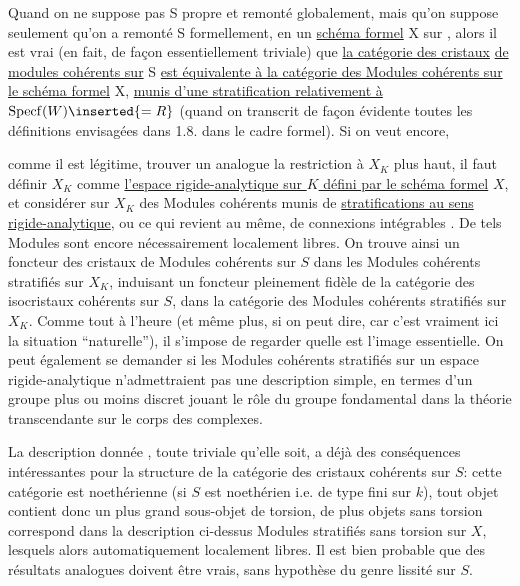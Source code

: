 Quand on ne suppose pas S  propre et remonté globalement, mais qu'on suppose seulement qu'on a remonté S formellement, en un \uline{schéma formel} X sur , alors il est vrai (en fait, de façon essentiellement triviale) que \uline{la catégorie des cristaux}  \uline{de modules cohérents sur} S \uline{est équivalente à la catégorie des Modules cohérents sur le schéma formel} X, \uline{munis d'une stratification relativement à} $\operatorname{Specf}(W)\inserted{=R}$ (quand on transcrit de façon évidente toutes les définitions envisagées dans 1.8. dans le cadre formel). Si on veut encore,


comme il est légitime, trouver un analogue   la restriction à $X_K$  plus haut, il faut définir $X_K$ comme \uline{l'espace rigide-analytique sur $K$ défini par le schéma formel} $X$, et considérer sur $X_K$ des Modules cohérents munis de  \uline{stratifications au sens rigide-analytique}, ou ce qui revient au même, de connexions intégrables . De tels Modules sont encore nécessairement localement libres. On trouve ainsi un foncteur des cristaux de Modules cohérents sur $S$ dans les Modules cohérents stratifiés sur $X_K$, induisant un foncteur pleinement fidèle de la catégorie des isocristaux cohérents sur $S$, dans la catégorie des Modules cohérents stratifiés sur $X_K$. Comme tout à l'heure (et même plus, si on peut dire, car c'est vraiment  ici la situation ``naturelle''), il s'impose de regarder quelle est l'image essentielle. On peut également se demander si les Modules cohérents stratifiés sur un espace rigide-analytique n'admettraient pas une description simple, en termes d'un groupe plus ou moins discret jouant le rôle du groupe fondamental dans la théorie transcendante sur le corps des complexes.

 La description donnée , toute triviale qu'elle soit, a déjà des conséquences intéressantes pour la structure de la catégorie des cristaux  cohérents sur $S$:  cette catégorie est noethérienne (si $S$ est noethérien i.e. de type fini sur $k$), tout objet contient donc un plus grand sous-objet de torsion, de plus   objets sans torsion correspond dans la description ci-dessus   Modules stratifiés sans torsion sur $X$, lesquels   alors automatiquement localement libres. Il est bien probable que des résultats analogues doivent être vrais, sans hypothèse du genre lissité sur $S$.

